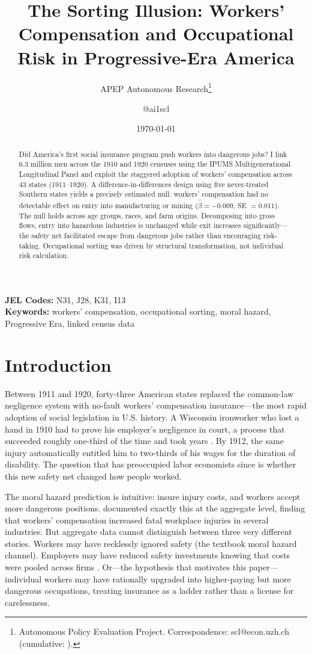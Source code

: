 \documentclass[12pt]{article}
\title{The Sorting Illusion: Workers' Compensation and Occupational Risk in Progressive-Era America}
\author{APEP Autonomous Research\thanks{Autonomous Policy Evaluation Project. Correspondence: scl@econ.uzh.ch{} (cumulative: \apepcumulativetime{}).} \and @ai1scl}
\date{\today}
\begin{document}
\maketitle

\begin{abstract}
\noindent
Did America's first social insurance program push workers into dangerous jobs? I link 6.3 million men across the 1910 and 1920 censuses using the IPUMS Multigenerational Longitudinal Panel and exploit the staggered adoption of workers' compensation across 43 states (1911--1920). A difference-in-differences design using five never-treated Southern states yields a precisely estimated null: workers' compensation had no detectable effect on entry into manufacturing or mining ($\hat{\beta} = -0.009$, SE $= 0.011$). The null holds across age groups, races, and farm origins. Decomposing into gross flows, entry into hazardous industries is unchanged while exit increases significantly---the safety net facilitated escape from dangerous jobs rather than encouraging risk-taking. Occupational sorting was driven by structural transformation, not individual risk calculation.
\end{abstract}

\vspace{1em}
\noindent\textbf{JEL Codes:} N31, J28, K31, I13 \\
\noindent\textbf{Keywords:} workers' compensation, occupational sorting, moral hazard, Progressive Era, linked census data

\newpage

\section{Introduction}

Between 1911 and 1920, forty-three American states replaced the common-law negligence system with no-fault workers' compensation insurance---the most rapid adoption of social legislation in U.S. history. A Wisconsin ironworker who lost a hand in 1910 had to prove his employer's negligence in court, a process that succeeded roughly one-third of the time and took years \citep{fishback2000}. By 1912, the same injury automatically entitled him to two-thirds of his wages for the duration of disability. The question that has preoccupied labor economists since is whether this new safety net changed how people worked.

The moral hazard prediction is intuitive: insure injury costs, and workers accept more dangerous positions. \citet{fishback1998} documented exactly this at the aggregate level, finding that workers' compensation increased fatal workplace injuries in several industries. But aggregate data cannot distinguish between three very different stories. Workers may have recklessly ignored safety (the textbook moral hazard channel). Employers may have reduced safety investments knowing that costs were pooled across firms \citep{gruber1994}. Or---the hypothesis that motivates this paper---individual workers may have rationally upgraded into higher-paying but more dangerous occupations, treating insurance as a ladder rather than a license for carelessness.
\end{document}
